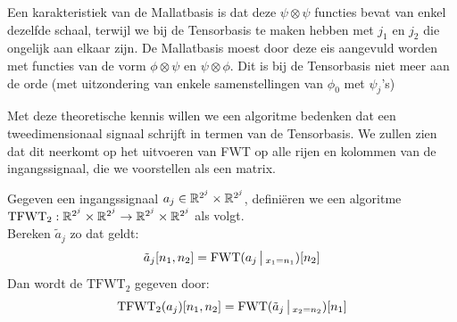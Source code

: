 Een karakteristiek van de Mallatbasis is dat deze $\psi \otimes \psi$ functies bevat van enkel dezelfde schaal,
terwijl we bij de Tensorbasis te maken hebben met $j_1$ en $j_2$ die ongelijk aan elkaar zijn.
De Mallatbasis moest door deze eis aangevuld worden met functies van de vorm $\phi\otimes\psi$ en $\psi\otimes\phi$.
Dit is bij de Tensorbasis niet meer aan de orde (met uitzondering van enkele samenstellingen van $\phi_0$ met $\psi_j$'s)

Met deze theoretische kennis willen we een algoritme bedenken dat een tweedimensionaal signaal schrijft 
in termen van de Tensorbasis. We zullen zien dat dit neerkomt op het uitvoeren van FWT op alle rijen en 
kolommen van de ingangssignaal, die we voorstellen als een matrix.

\begin{algo}
Gegeven een ingangssignaal $a_j\in\mathbb{R}^{2^j}\times\mathbb{R}^{2^j}$, defini\"eren we een  algoritme 
\mbox{$\mathrm{TFWT}_2:\mathbb{R}^{2^j}\times\mathbb{R}^{2^j}\to \mathbb{R}^{2^j}\times\mathbb{R}^{2^j}$} als volgt.\\
Bereken $\tilde a_j$ zo dat geldt:
\[
\tilde a_j[n_1,n_2] = \mathrm{FWT}(a_j\,\big|\,_{x_1=n_1})[n_2] 
\]
Dan wordt de $\mathrm{TFWT}_2$ gegeven door:
\[
\mathrm{TFWT}_2(a_j)[n_1,n_2] = \mathrm{FWT}(\tilde a_j\,\big|\,_{x_2=n_2})[n_1]
\] 
\end{algo}

